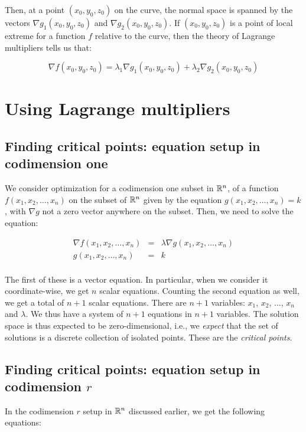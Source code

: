 \documentclass[10pt]{amsart}
\begin{document}
Then, at a point $(x_0,y_0,z_0)$ on the curve, the normal space
is spanned by the vectors $\nabla g_1(x_0,y_0,z_0)$ and $\nabla
g_2(x_0,y_0,z_0)$. If $(x_0,y_0,z_0)$ is a point of local extreme for
a function $f$ relative to the curve, then the theory of Lagrange
multipliers tells us that:

$$\nabla f(x_0,y_0,z_0) = \lambda_1 \nabla g_1(x_0,y_0,z_0) + \lambda_2 \nabla g_2(x_0,y_0,z_0)$$

\section{Using Lagrange multipliers}

\subsection{Finding critical points: equation setup in codimension one}

We consider optimization for a codimension one subset in $\mathbb{R}^n$, of a
function $f(x_1,x_2,\dots,x_n)$ on the subset of $\mathbb{R}^n$ given by the
equation $g(x_1,x_2,\dots,x_n) = k$, with $\nabla g$ not a zero vector
anywhere on the subset. Then, we need to solve the equation:

\begin{eqnarray*}
  \nabla f(x_1,x_2,\dots,x_n) & = & \lambda \nabla g(x_1,x_2,\dots,x_n) \\
  g(x_1,x_2,\dots,x_n) & = & k\\
\end{eqnarray*}

The first of these is a vector equation. In particular, when we
consider it coordinate-wise, we get $n$ scalar equations. Counting the
second equation as well, we get a total of $n + 1$ scalar
equations. There are $n + 1$ variables: $x_1$, $x_2$, $\dots$, $x_n$
and $\lambda$. We thus have a system of $n + 1$ equations in $n + 1$
variables. The solution space is thus expected to be zero-dimensional,
i.e., we {\em expect} that the set of solutions is a discrete
collection of isolated points. These are the {\em critical points}.

\subsection{Finding critical points: equation setup in codimension $r$}

In the codimension $r$ setup in $\mathbb{R}^n$ discussed earlier, we get the
following equations:
\end{document}
